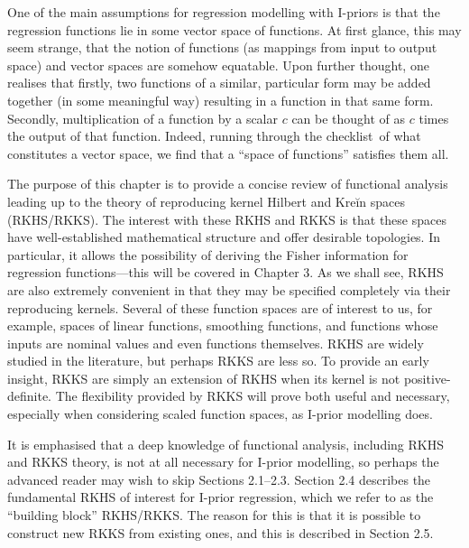 \documentclass[a4paper,showframe,11pt]{report}
\begin{document}

One of the main assumptions for regression modelling with I-priors is that the regression functions lie in some vector space of functions.
At first glance, this may seem strange, that the notion of functions (as mappings from input to output space) and vector spaces are somehow equatable.
Upon further thought, one realises that firstly, two functions of a similar, particular form may be added together (in some meaningful way) resulting in a function in that same form. 
Secondly, multiplication of a function by a scalar $c$ can be thought of as $c$ times the output of that function.
Indeed, running through the checklist\footnotemark~of what constitutes a vector space, we find that a ``space of functions'' satisfies them all.

The purpose of this chapter is to provide a concise review of functional analysis leading up to the theory of reproducing kernel Hilbert and Kreĭn spaces (RKHS/RKKS).
The interest with these RKHS and RKKS is that these spaces have well-established mathematical structure and offer desirable topologies.
In particular, it allows the possibility of deriving the Fisher information for regression functions---this will be covered in Chapter 3.
As we shall see, RKHS are also extremely convenient in that they may be specified completely via their reproducing kernels.
Several of these function spaces are of interest to us, for example, spaces of linear functions, smoothing functions, and functions whose inputs are nominal values and even functions themselves.
RKHS are widely studied in the literature, but perhaps RKKS are less so.
To provide an early insight, RKKS are simply an extension of RKHS when its kernel is not positive-definite.
The flexibility provided by RKKS will prove both useful and necessary, especially when considering scaled function spaces, as I-prior modelling does.

It is emphasised that a deep knowledge of functional analysis, including RKHS and RKKS theory, is not at all necessary for I-prior modelling, so perhaps the advanced reader may wish to skip Sections 2.1--2.3. 
Section 2.4 describes the fundamental RKHS of interest for I-prior regression, which we refer to as the ``building block'' RKHS/RKKS.
The reason for this is that it is possible to construct new RKKS from existing ones, and this is described in Section 2.5.
\end{document}
